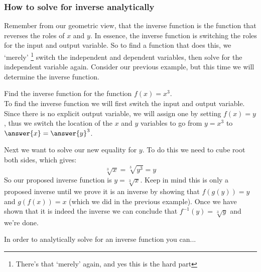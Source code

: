 \documentclass{ximera}
\begin{document}
    
    \subsubsection*{How to solve for inverse analytically}
    
        Remember from our geometric view, that the inverse function is the function that reverses the roles of $x$ and $y$. In essence, the inverse function is switching the roles for the input and output variable. So to find a function that does this, we `merely'%
        \footnote{There's that `merely' again, and yes this is the hard part} switch the independent and dependent variables, then solve for the independent variable again. Consider our previous example, but this time we will determine the inverse function.
        \begin{example}
            {\large Find the inverse function for the function $f(x) = x^3$.}\\
            
            To find the inverse function we will first switch the input and output variable. Since there is no explicit output variable, we will assign one by setting $f(x) = y$, thus we switch the location of the $x$ and $y$ variables to go from $y = x^3$ to $\answer{x} = \answer{y}^3$.
            
            Next we want to solve our new equality for $y$. To do this we need to cube root both sides, which gives:
            \[
                \sqrt[3]{x} = \sqrt[3]{y^3} = y
            \]
            So our proposed inverse function is $y = \sqrt[3]{x}$. Keep in mind this is only a proposed inverse until we prove it is an inverse by showing that $f(g(y)) = y$ and $g(f(x)) = x$ (which we did in the previous example). Once we have shown that it is indeed the inverse we can conclude that $f^{-1}(y) = \sqrt[3]{y}$ and we're done.
        \end{example}
        
        
    \begin{problem}
        In order to analytically solve for an inverse function you can...
        \begin{multipleChoice}
        \end{multipleChoice}
    \end{problem}
\end{document}
